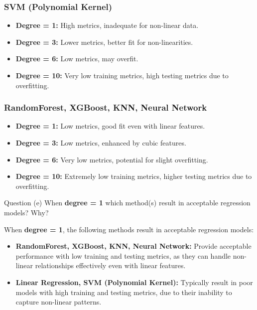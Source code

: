 \subsubsection*{SVM (Polynomial Kernel)}

\begin{itemize}
    \item \textbf{Degree = 1:} High metrics, inadequate for non-linear data.
    \item \textbf{Degree = 3:} Lower metrics, better fit for non-linearities.
    \item \textbf{Degree = 6:} Low metrics, may overfit.
    \item \textbf{Degree = 10:} Very low training metrics, high testing metrics due to overfitting.
\end{itemize}

\subsubsection*{RandomForest, XGBoost, KNN, Neural Network}

\begin{itemize}
    \item \textbf{Degree = 1:} Low metrics, good fit even with linear features.
    \item \textbf{Degree = 3:} Low metrics, enhanced by cubic features.
    \item \textbf{Degree = 6:} Very low metrics, potential for slight overfitting.
    \item \textbf{Degree = 10:} Extremely low training metrics, higher testing metrics due to overfitting.
\end{itemize}


\begin{customboxnew}[label={box:Q3e}]{Question (e)}
	When \textbf{degree = 1} which method(s) result in acceptable regression models? Why?
\end{customboxnew}

When \textbf{degree = 1}, the following methods result in acceptable regression models:

\begin{itemize}
    \item \textbf{RandomForest, XGBoost, KNN, Neural Network:} Provide acceptable performance with low training and testing metrics, as they can handle non-linear relationships effectively even with linear features.
    \item \textbf{Linear Regression, SVM (Polynomial Kernel):} Typically result in poor models with high training and testing metrics, due to their inability to capture non-linear patterns.
\end{itemize}

